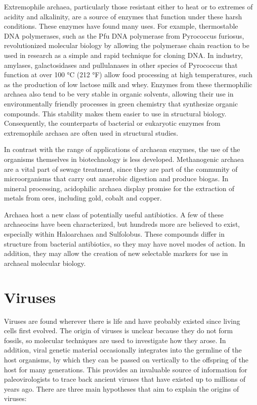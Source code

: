Extremophile archaea, particularly those resistant either to heat or to extremes of acidity and alkalinity, are a source of enzymes that function under these harsh conditions. These enzymes have found many uses. For example, thermostable DNA polymerases, such as the Pfu DNA polymerase from Pyrococcus furiosus, revolutionized molecular biology by allowing the polymerase chain reaction to be used in research as a simple and rapid technique for cloning DNA. In industry, amylases, galactosidases and pullulanases in other species of Pyrococcus that function at over 100 °C (212 °F) allow food processing at high temperatures, such as the production of low lactose milk and whey. Enzymes from these thermophilic archaea also tend to be very stable in organic solvents, allowing their use in environmentally friendly processes in green chemistry that synthesize organic compounds. This stability makes them easier to use in structural biology. Consequently, the counterparts of bacterial or eukaryotic enzymes from extremophile archaea are often used in structural studies.

In contrast with the range of applications of archaean enzymes, the use of the organisms themselves in biotechnology is less developed. Methanogenic archaea are a vital part of sewage treatment, since they are part of the community of microorganisms that carry out anaerobic digestion and produce biogas. In mineral processing, acidophilic archaea display promise for the extraction of metals from ores, including gold, cobalt and copper.

Archaea host a new class of potentially useful antibiotics. A few of these archaeocins have been characterized, but hundreds more are believed to exist, especially within Haloarchaea and Sulfolobus. These compounds differ in structure from bacterial antibiotics, so they may have novel modes of action. In addition, they may allow the creation of new selectable markers for use in archaeal molecular biology.

\hypertarget{viruses}{%
\section{Viruses}\label{viruses}}

Viruses are found wherever there is life and have probably existed since living cells first evolved. The origin of viruses is unclear because they do not form fossils, so molecular techniques are used to investigate how they arose. In addition, viral genetic material occasionally integrates into the germline of the host organisms, by which they can be passed on vertically to the offspring of the host for many generations. This provides an invaluable source of information for paleovirologists to trace back ancient viruses that have existed up to millions of years ago. There are three main hypotheses that aim to explain the origins of viruses:

